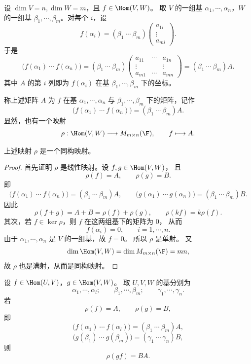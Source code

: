 设 $\dim V=n,\dim W=m$，且 $f\in\Hom(V,W)$。
取 $V$ 的一组基 $\alpha_1,\cdots,\alpha_n$，$W$ 的一组基
$\beta_1,\cdots,\beta_m$。对每个 $i$，设
\[
f(\alpha_i)=
(\beta_1\ \cdots\ \beta_m)
\begin{pmatrix}
	a_{1i}\\
	\vdots\\
	a_{mi}
\end{pmatrix}.
\]
于是
\[
\bigl(f(\alpha_1)\ \cdots\ f(\alpha_n)\bigr)
=
(\beta_1\ \cdots\ \beta_m)
\begin{pmatrix}
	a_{11}&\cdots&a_{1n}\\
	\vdots& &\vdots\\
	a_{m1}&\cdots&a_{mn}
\end{pmatrix}
=(\beta_1\ \cdots\ \beta_m)A.
\]
其中 $A$ 的第 $i$ 列即为 $f(\alpha_i)$ 在基
$\beta_1,\cdots,\beta_m$ 下的坐标。

\begin{definition}
	称上述矩阵 $A$ 为 $f$ 在基 $\alpha_1,\cdots,\alpha_n$
	与 $\beta_1,\cdots,\beta_m$ 下的矩阵，记作
	\[
	\bigl(f(\alpha_1)\ \cdots\ f(\alpha_n)\bigr)
	=(\beta_1\ \cdots\ \beta_m)A.
	\]
	显然，也有一个映射
	\[
	\rho:\Hom(V,W)\longrightarrow M_{m\times n}(\F),
	\qquad
	f\longmapsto A.
	\]
\end{definition}

\begin{lemma}
	上述映射 $\rho$ 是一个同构映射。
\end{lemma}

\begin{proof}
	首先证明 $\rho$ 是线性映射。设 $f,g\in\Hom(V,W)$，
	且
	\[
	\rho(f)=A,
	\qquad
	\rho(g)=B.
	\]
	即
	\[
	\bigl(f(\alpha_1)\ \cdots\ f(\alpha_n)\bigr)
	=(\beta_1\ \cdots\ \beta_m)A,
	\qquad
	\bigl(g(\alpha_1)\ \cdots\ g(\alpha_n)\bigr)
	=(\beta_1\ \cdots\ \beta_m)B.
	\]
	因此
	\[
	\rho(f+g)=A+B=\rho(f)+\rho(g),
	\qquad
	\rho(kf)=k\rho(f).
	\]
	其次，若 $f\in\ker\rho$，则 $f$ 在这两组基下的矩阵为 $0$，
	从而
	\[
	f(\alpha_i)=0,
	\qquad i=1,\cdots,n.
	\]
	由于 $\alpha_1,\cdots,\alpha_n$ 是 $V$ 的一组基，故 $f=0$。
	所以 $\rho$ 是单射。
	又
	\[
	\dim\Hom(V,W)=\dim M_{m\times n}(\F)=mn,
	\]
	故 $\rho$ 也是满射，从而是同构映射。
\end{proof}

\begin{lemma}
	设 $f\in\Hom(U,V)$，$g\in\Hom(V,W)$。
	取 $U,V,W$ 的基分别为
	\[
	\alpha_1,\cdots,\alpha_l;
	\qquad
	\beta_1,\cdots,\beta_m;
	\qquad
	\gamma_1,\cdots,\gamma_n.
	\]
	若
	\[
	\rho(f)=A,
	\qquad
	\rho(g)=B,
	\]
	即
	\[
	\bigl(f(\alpha_1)\ \cdots\ f(\alpha_l)\bigr)
	=(\beta_1\ \cdots\ \beta_m)A,
	\]
	\[
	\bigl(g(\beta_1)\ \cdots\ g(\beta_m)\bigr)
	=(\gamma_1\ \cdots\ \gamma_n)B,
	\]
	则
	\[
	\rho(gf)=BA.
	\]
\end{lemma}

